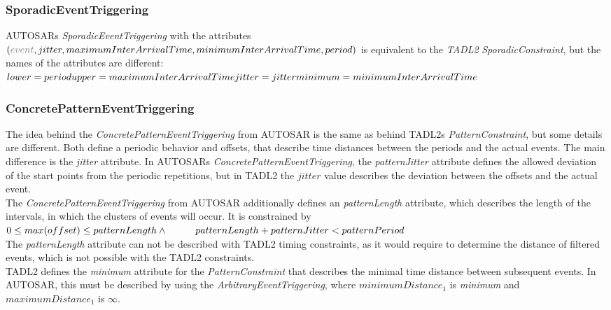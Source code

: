 	\subsubsection{SporadicEventTriggering}
		AUTOSARs \emph{SporadicEventTriggering} with the attributes\\
		 $(\textcolor{gray}{event}, jitter, maximumInterArrivalTime,  minimumInterArrivalTime, period)$ is equivalent to the \emph{TADL2} \emph{SporadicConstraint}, but the names of the attributes are different:\\
		\begin{math}
			lower=period\\
			upper=maximumInterArrivalTime\\
			jitter=jitter\\
			minimum=minimumInterArrivalTime
		\end{math}
	
	\subsubsection{ConcretePatternEventTriggering}
		The idea behind the \emph{ConcretePatternEventTriggering} from AUTOSAR is the same as behind TADL2s \emph{PatternConstraint}, but some details are different. Both define a periodic behavior and offsets, that describe time distances between the periods and the actual events. The main difference is the \emph{jitter} attribute. In AUTOSARs \emph{ConcretePatternEventTriggering}, the \emph{patternJitter} attribute defines the allowed deviation of the start points from the periodic repetitions, but in TADL2 the $jitter$ value describes the deviation between the offsets and the actual event.\\
		The \emph{ConcretePatternEventTriggering} from AUTOSAR additionally defines an \emph{patternLength} attribute, which describes the length of the intervals, in which the clusters of events will occur. It is constrained by\\[10pt]
		\begin{math}
			0\leq max(offset)\leq patternLength\\
			\land \hspace{1cm}patternLength + patternJitter < patternPeriod
		\end{math}\\[10pt]
		The \emph{patternLength} attribute can not be described with TADL2 timing constraints, as it would require to determine the distance of filtered events, which is not possible with the TADL2 constraints.\\
		TADL2 defines the \emph{minimum} attribute for the \emph{PatternConstraint} that describes the minimal time distance between subsequent events. In AUTOSAR, this must be described by using the \emph{ArbitraryEventTriggering}, where $minimumDistance_1$ is \emph{minimum} and $maximumDistance_1$ is $\infty$.
		
